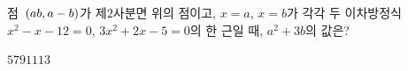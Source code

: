 점~$(ab{,}\mkern3mu a-b)$가 제$2$사분면 위의 점이고, $x=a$, $x=b$가 각각 두 이차방정식 $x^2-x-12=0$, $3x^2+2x-5=0$의 한 근일 때, $a^2+3b$의 값은?
\begin{choices32}{$5$}{$7$}{$9$}{$11$}{$13$}\end{choices32}
